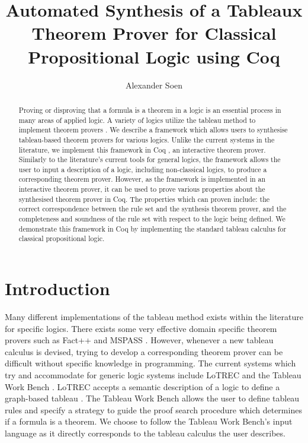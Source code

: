 \documentclass{llncs}
\begin{document}
\title{Automated Synthesis of a Tableaux Theorem Prover for Classical
Propositional Logic using Coq}

\author{Alexander Soen}

\maketitle
%
\begin{abstract}
Proving or disproving that a formula is a theorem in a logic is an essential
process in many areas of applied logic. A variety of logics utilize the tableau
method to implement theorem provers \cite{d2013handbook}. We describe a
framework which allows users to synthesise tableau-based theorem provers for
various logics. Unlike the current systems in the literature, we implement this
framework in Coq \cite{barras1997coq}, an interactive theorem prover. Similarly
to the literature's current tools for general logics, the framework allows the
user to input a description of a logic, including non-classical logics, to
produce a corresponding theorem prover. However, as the framework is
implemented in an interactive theorem prover, it can be used to prove various
properties about the synthesised theorem prover in Coq. The properties which
can proven include: the correct correspondence between the rule set and the
synthesis theorem prover, and the completeness and soundness of the rule set
with respect to the logic being defined. We demonstrate this framework in Coq
by implementing the standard tableau calculus for classical propositional
logic.
\end{abstract}
%
\section{Introduction}
%
Many different implementations of the tableau method exists within the
literature for specific logics. There exists some very effective domain
specific theorem provers such as Fact++ \cite{tsarkov2006fact++}
and MSPASS \cite{hustadt2000mspass}. However, whenever a new tableau calculus is
devised, trying to develop a corresponding theorem prover can be difficult
without specific knowledge in programming. The current systems which try and
accommodate for generic logic systems include LoTREC \cite{del2001lotrec} and
the Tableau Work Bench \cite{abate2007tableau}. LoTREC accepts a semantic
description of a logic to define a graph-based tableau
\cite{castilho1997modal}. The Tableau Work Bench allows the user to define
tableau rules and specify a strategy to guide the proof search procedure which
determines if a formula is a theorem. We choose to follow the Tableau Work
Bench's input language as it directly corresponds to the tableau calculus the
user describes.
\end{document}
